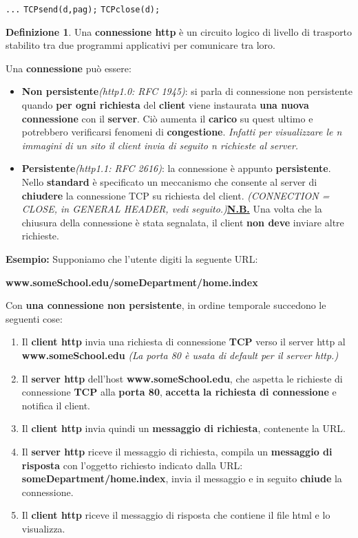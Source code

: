 \documentclass[11pt,a4paper]{article}
\theoremstyle{definition}
\newtheorem{definition}{Definizione}[section]
\begin{document}
\texttt{...}\newline
\texttt{TCPsend(d,pag);}\newline
\texttt{TCPclose(d);}\newline
\theoremstyle{definition}
\begin{definition}
	Una \textbf{connessione http} è  un circuito logico di livello di trasporto stabilito tra due programmi applicativi per comunicare tra loro.
\end{definition}
Una \textbf{connessione} può essere:
\begin{itemize}
	\item \textbf{Non persistente}\textit{(http1.0: RFC 1945)}: si parla di connessione non persistente quando \textbf{per ogni richiesta} del \textbf{client} viene instaurata \textbf{una nuova connessione} con il \textbf{server}. Ciò aumenta il \textbf{carico} su quest ultimo e potrebbero verificarsi fenomeni di \textbf{congestione}. \textit{Infatti per visualizzare le n immagini di un sito il client invia di seguito n richieste al server.}
	\item \textbf{Persistente}\textit{(http1.1: RFC 2616)}: la connessione è appunto \textbf{persistente}. Nello \textbf{standard} è specificato un meccanismo che consente al server di \textbf{chiudere} la connessione TCP su richiesta del client. \textit{(CONNECTION = CLOSE, in GENERAL HEADER, vedi seguito.)}\newline \textbf{\underline{N.B.}} Una volta che la chiusura della connessione è stata segnalata, il client \textbf{non deve} inviare altre richieste.
\end{itemize}
\newpage
\textbf{Esempio:}\newline
Supponiamo che l’utente digiti la seguente URL:\newline\newline \centerline{\textbf{www.someSchool.edu/someDepartment/home.index}}\newline\newline
Con \textbf{una connessione non persistente}, in ordine temporale succedono le seguenti cose:
\begin{enumerate}
	\item Il \textbf{client http}  invia una richiesta di connessione
	      \textbf{TCP} verso il server http al \textbf{www.someSchool.edu} \textit{(La porta 80 è usata di default per il server http.)}
	\item Il \textbf{server http} dell’host	\textbf{www.someSchool.edu}, che aspetta le richieste di connessione \textbf{TCP} alla \textbf{porta 80}, \textbf{accetta} \textbf{la richiesta di connessione}  e notifica il client.
	\item Il \textbf{client http} invia quindi un \textbf{messaggio di richiesta}, contenente la URL.
	\item Il \textbf{server http} riceve il messaggio di richiesta, compila un \textbf{messaggio di risposta} con l’oggetto richiesto indicato dalla URL: \textbf{someDepartment/home.index}, invia il messaggio e in seguito \textbf{chiude} la connessione.
	\item Il \textbf{client http}  riceve il messaggio di risposta che contiene il file html e lo visualizza.
\end{enumerate}
\end{document}
